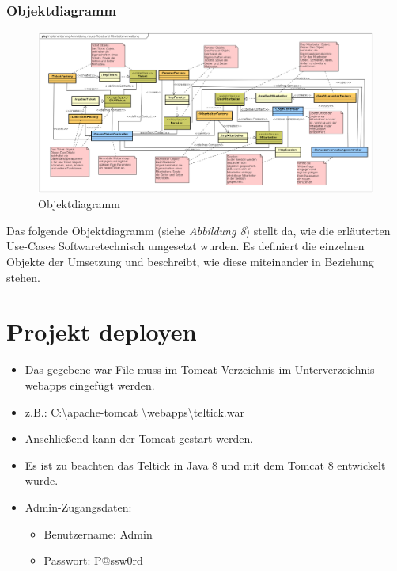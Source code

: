 \documentclass[12pt, a4paper]{article}
\begin{document}
\subsubsection{Objektdiagramm}
\begin{figure}[H]
	\begin{center}
		\includegraphics[width=208mm,angle=90]{Bilder/ObjektDiagramm.png}
	\end{center}
	\caption{Objektdiagramm}
\end{figure}
Das folgende Objektdiagramm (siehe\textit{ Abbildung 8}) stellt da, wie die erläuterten Use-Cases Softwaretechnisch umgesetzt wurden. Es definiert die einzelnen Objekte der Umsetzung und beschreibt, wie diese miteinander in Beziehung stehen.

\section{Projekt deployen}
\begin{itemize}
\item Das gegebene war-File muss im Tomcat Verzeichnis im Unterverzeichnis \glqq webapps\grqq{} eingefügt werden.
\item z.B.: \glqq C:\textbackslash apache-tomcat \textbackslash webapps\textbackslash teltick.war\grqq{}
\item Anschließend kann der Tomcat gestart werden.
\item Es ist zu beachten das \glqq Teltick\grqq{} in Java 8 und mit dem Tomcat 8 entwickelt wurde.
\item Admin-Zugangsdaten:
  \begin{itemize}
         \item Benutzername: Admin
         \item Passwort: P@ssw0rd
      \end{itemize}


\end{itemize}
\end{document}
